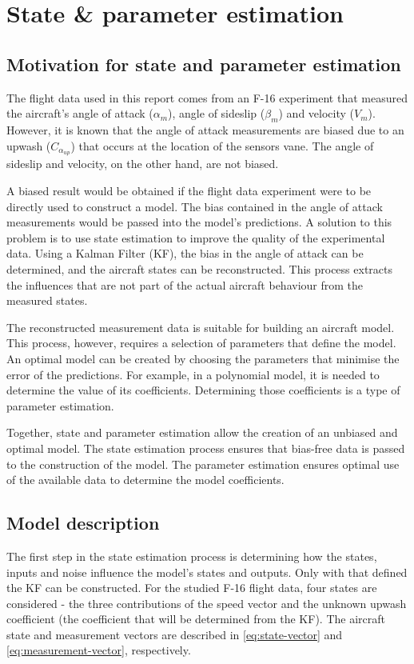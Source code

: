 \chapter{State \& parameter estimation}
\label{chapter:state-parameter-estimation}

\section{Motivation for state and parameter estimation}
The flight data used in this report comes from an F-16 experiment that measured the aircraft's angle of attack ($\alpha_m$), angle of sideslip ($\beta_m$) and velocity ($V_m$). However, it is known that the angle of attack measurements are biased due to an upwash ($C_{\alpha_{up}}$) that occurs at the location of the sensors vane. The angle of sideslip and velocity, on the other hand, are not biased.

A biased result would be obtained if the flight data experiment were to be directly used to construct a model. The bias contained in the angle of attack measurements would be passed into the model's predictions. A solution to this problem is to use state estimation to improve the quality of the experimental data. Using a Kalman Filter (KF), the bias in the angle of attack can be determined, and the aircraft states can be reconstructed. This process extracts the influences that are not part of the actual aircraft behaviour from the measured states. 

The reconstructed measurement data is suitable for building an aircraft model. This process, however, requires a selection of parameters that define the model. An optimal model can be created by choosing the parameters that minimise the error of the predictions. For example, in a polynomial model, it is needed to determine the value of its coefficients. Determining those coefficients is a type of parameter estimation.

Together, state and parameter estimation allow the creation of an unbiased and optimal model. The state estimation process ensures that bias-free data is passed to the construction of the model. The parameter estimation ensures optimal use of the available data to determine the model coefficients.


\section{Model description}
The first step in the state estimation process is determining how the states, inputs and noise influence the model's states and outputs. Only with that defined the KF can be constructed. For the studied F-16 flight data, four states are considered - the three contributions of the speed vector and the unknown upwash coefficient (the coefficient that will be determined from the KF). The aircraft state and measurement vectors are described in \autoref{eq:state-vector} and \autoref{eq:measurement-vector}, respectively. 

